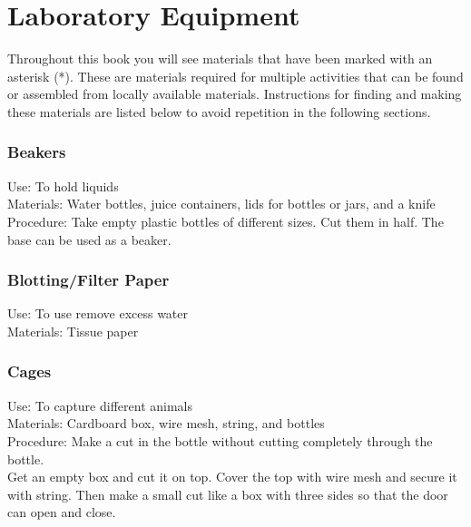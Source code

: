 \chapter{Laboratory Equipment}
Throughout this book you will see materials that have been marked with an asterisk (*). These are materials required for multiple activities that can be found or assembled from locally available materials. Instructions for finding and making these materials are listed below to avoid repetition in the following sections.


\subsection*{Beakers}


Use: To hold liquids\\
Materials: Water bottles, juice containers, lids for bottles or jars, and a knife\\
Procedure: Take empty plastic bottles of different sizes. Cut them in half. The base can be used as a beaker.\\

%

\subsection*{Blotting/Filter Paper}


Use: To use remove excess water\\
Materials: Tissue paper \\


\subsection*{Cages}


Use: To capture different animals\\
Materials: Cardboard box, wire mesh, string, and bottles\\
Procedure: Make a cut in the bottle without cutting completely through the bottle.\\Get an empty box and cut it on top. Cover the top with wire mesh and secure it with string. Then make a small cut like a box with three sides so that the door can open and close.  

